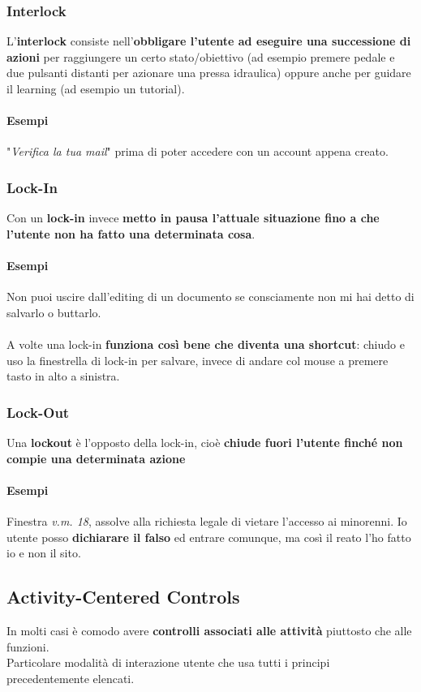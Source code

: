 \documentclass[10pt]{article}
\begin{document}
\subsubsection{Interlock}
L'\textbf{interlock} consiste nell'\textbf{obbligare l'utente ad eseguire una successione di azioni} per raggiungere un certo stato/obiettivo (ad esempio premere pedale e due pulsanti distanti per azionare una pressa idraulica) oppure anche per guidare il learning (ad esempio un tutorial).
\paragraph{Esempi} "\textit{Verifica la tua mail}" prima di poter accedere con un account appena creato.
\subsubsection{Lock-In}
Con un \textbf{lock-in} invece \textbf{metto in pausa l'attuale situazione fino a che l'utente non ha fatto una determinata cosa}. 
\paragraph{Esempi} Non puoi uscire dall'editing di un documento se consciamente non mi hai detto di salvarlo o buttarlo.\\\\
A volte una lock-in \textbf{funziona così bene che diventa una shortcut}: chiudo e uso la finestrella di lock-in per salvare, invece di andare col mouse a premere tasto in alto a sinistra.
\subsubsection{Lock-Out}
Una \textbf{lockout} è l'opposto della lock-in, cioè \textbf{chiude fuori l'utente finché non compie una determinata azione}
\paragraph{Esempi} Finestra \textit{v.m. 18}, assolve alla richiesta legale di vietare l'accesso ai minorenni. Io utente posso \textbf{dichiarare il falso} ed entrare comunque, ma così il reato l'ho fatto io e non il sito.
\subsection{Activity-Centered Controls}
In molti casi è comodo avere \textbf{controlli associati alle attività} piuttosto che alle funzioni.\\Particolare modalità di interazione utente che usa tutti i principi precedentemente elencati.
\end{document}
